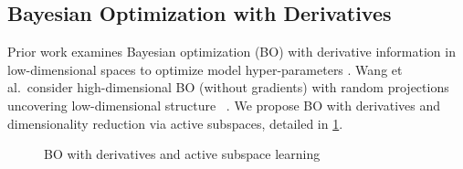 \subsection{Bayesian Optimization with Derivatives}

Prior work examines Bayesian optimization (BO) with derivative information in
low\hyp{}dimensional spaces to optimize model hyper\hyp{}parameters 
\citep{wu2017bayesian}. Wang et al.~consider high\hyp{}dimensional BO (without
gradients) with random projections uncovering low\hyp{}dimensional structure~
\citep{wang2013bayesian}. We propose BO with derivatives and dimensionality
reduction via active subspaces, detailed in \cref{alg:BO}.

\begin{figure}[htbp]
  \begin{algorithm}[H]
    \DontPrintSemicolon
    \caption{BO with derivatives and active subspace learning}\label{alg:BO}
  \end{algorithm}
\end{figure}

